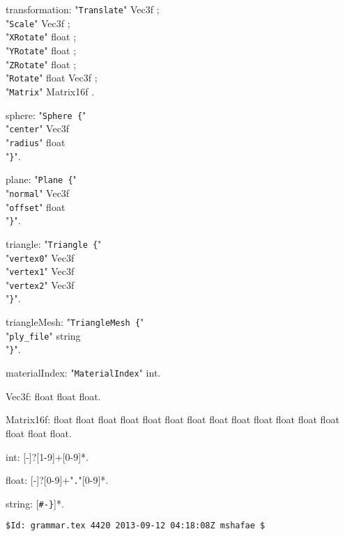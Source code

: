 \documentclass[twoside]{article}
\begin{document}
\begin{grammar}
transformation: "\verb!Translate!" { Vec3f } ;\\
  "\verb!Scale!" { Vec3f } ;\\
  "\verb!XRotate!" { float } ;\\
  "\verb!YRotate!" { float } ;\\
  "\verb!ZRotate!" { float } ;\\
  "\verb!Rotate!" { float Vec3f } ;\\
  "\verb!Matrix!" { Matrix16f }.

sphere: "\verb!Sphere {!"\\
    "\verb!center!" Vec3f\\
    "\verb!radius!" float\\
"\verb!}!".

plane: "\verb!Plane {!"\\
  "\verb!normal!" Vec3f\\
  "\verb!offset!" float\\
"\verb!}!".

triangle: "\verb!Triangle {!"\\
  "\verb!vertex0!" Vec3f\\
  "\verb!vertex1!" Vec3f\\
  "\verb!vertex2!" Vec3f\\
"\verb!}!".

triangleMesh: "\verb!TriangleMesh {!"\\
  "\verb!ply_file!" string\\
"\verb!}!".

materialIndex: "\verb!MaterialIndex!" int.

Vec3f: float float float.

Matrix16f: float float float float float float float float float float float float float float float float.

int: [-]?[1-9]+[0-9]*.

float: [-]?[0-9]+"\verb!.!"[0-9]*.

string: [\verb!#-}!]*.

\end{grammar}
\vfill
\tiny
\begin{verbatim}
$Id: grammar.tex 4420 2013-09-12 04:18:08Z mshafae $
\end{verbatim}
\end{document}
